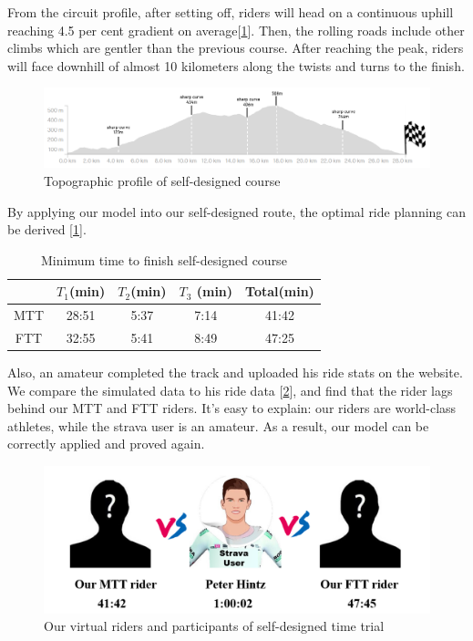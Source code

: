 \par From the circuit profile, after setting off, riders will head on a continuous uphill reaching 4.5 per cent gradient on average[\ref{self1}]. Then, the rolling roads include other climbs which are gentler than the previous course. After reaching the peak, riders will face downhill of almost 10 kilometers along the twists and turns to the finish.
\begin{figure}[h]
	\centering
	\includegraphics[width=0.9\linewidth]{image/self1}
	\caption{Topographic profile of self-designed course}
	\label{self1}
\end{figure}
\par By applying our model into our self-designed route, the optimal ride planning can be derived [\ref{time3}]. 
\begin{table}[h]
	\setlength{\belowcaptionskip}{0.2cm}
	\setlength\tabcolsep{16pt}%
	\centering
	\caption{ Minimum time to finish self-designed course}
	\begin{tabular}{ccccc}
		\toprule[2pt]
		&$ T_1$(min)    & $T_2$(min)    & $T_3$ (min)   & Total(min) \\
		\midrule
    MTT   & 28:51 & 5:37  & 7:14  & 41:42 \\
FTT   & 32:55 & 5:41  & 8:49  & 47:25 \\
\bottomrule[2pt]
\end{tabular}%
\label{time3}%
\end{table}%
\par Also, an amateur completed the track and uploaded his ride stats on the website. We compare the simulated data to his ride data [\ref{rider3}], and find that the rider lags behind our MTT and FTT riders. It's easy to explain: our riders are world-class athletes, while the strava user is an  amateur. As a result, our model can be correctly applied and proved again. 
\begin{figure}[h]
	\centering
	\includegraphics[width=0.7\linewidth]{image/rider3}
	\caption{Our virtual riders and participants of self-designed time trial}
	\label{rider3}
\end{figure}
